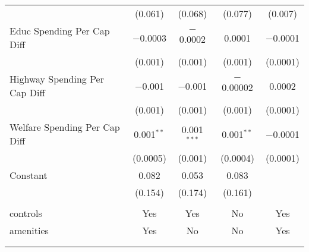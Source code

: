 \begin{table}[!htbp]
\begin{tabular}{@{\extracolsep{5pt}}lcccc}
  & (0.061) & (0.068) & (0.077) & (0.007) \\ 
  Educ Spending Per Cap Diff & $-$0.0003 & $-$0.0002 & 0.0001 & $-$0.0001 \\ 
  & (0.001) & (0.001) & (0.001) & (0.0001) \\ 
  Highway Spending Per Cap Diff & $-$0.001 & $-$0.001 & $-$0.00002 & 0.0002 \\ 
  & (0.001) & (0.001) & (0.001) & (0.0001) \\ 
  Welfare Spending Per Cap Diff & 0.001$^{**}$ & 0.001$^{***}$ & 0.001$^{**}$ & $-$0.0001 \\ 
  & (0.0005) & (0.001) & (0.0004) & (0.0001) \\ 
  Constant & 0.082 & 0.053 & 0.083 &  \\ 
  & (0.154) & (0.174) & (0.161) &  \\ 
 \hline \\[-1.8ex] 
controls & Yes & Yes & No & Yes \\ 
amenities & Yes & No & No & Yes \\ 
\hline \\[-1.8ex] 
\hline 
\hline \\[-1.8ex] 
\end{tabular} 
\end{table} 
